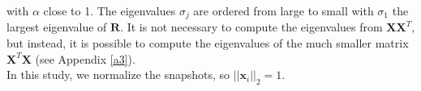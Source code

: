 \documentclass[review]{elsarticle}
\begin{document}
with $\alpha$ close to 1. The eigenvalues $\sigma_j$ are ordered from large to small with $\sigma_1$
the largest eigenvalue of $\mathbf{R}$. 
It is not necessary to compute the eigenvalues from $\mathbf{X}\mathbf{X}^T$, but instead, it is possible to compute the eigenvalues of the much smaller matrix $\mathbf{X}^T\mathbf{X}$ (see Appendix \ref{a3}). \\
In this study, we normalize the snapshots, so $||\mathbf{x}_i||_2=1.$
\end{document}
